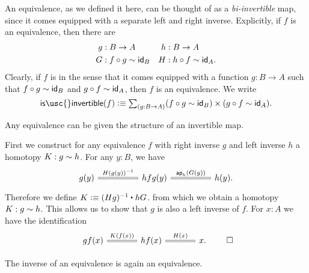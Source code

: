 \begin{rmk}
An equivalence, as we defined it here, can be thought of as a \emph{bi-invertible} map, since it comes equipped with a separate left and right inverse. Explicitly, if $f$ is an equivalence, then there are
\begin{align*}
g & : B\to A & h & : B\to A \\
G & : f\circ g \htpy \idfunc[B] & H & : h\circ f \htpy \idfunc[A].
\end{align*}
Clearly, if $f$ is  in the sense that it comes equipped with a function $g:B\to A$ such that $f\circ g\htpy\idfunc[B]$ and $g\circ f\htpy\idfunc[A]$, then $f$ is an equivalence. We write
\begin{equation*}
\mathsf{is\usc{}invertible}(f)\defeq\sm{g:B\to A} (f\circ g\htpy \idfunc[B])\times (g\circ f\htpy\idfunc[A]).
\end{equation*}
\end{rmk}

\begin{defn}\label{defn:inv_equiv}
Any equivalence can be given the structure of an invertible map.
\end{defn}

\begin{constr}
First we construct for any equivalence $f$ with right inverse $g$ and left inverse $h$ a homotopy $K:g\htpy h$. For any $y:B$, we have 
\begin{equation*}
\begin{tikzcd}[column sep=huge]
g(y) \arrow[r,equals,"H(g(y))^{-1}"] & hfg(y) \arrow[r,equals,"\ap{h}{G(y)}"] & h(y).
\end{tikzcd}
\end{equation*} 
Therefore we define $K\defeq \ct{(Hg)^{-1}}{hG}$.
from which we obtain a homotopy $K:g\htpy h$.
This allows us to show that $g$ is also a left inverse of $f$. For $x:A$ we have the identification
\begin{equation*}
\begin{tikzcd}[column sep=large]
gf(x) \arrow[r,equals,"K(f(x))"] & hf(x) \arrow[r,equals,"H(x)"] & x.
\end{tikzcd}\qedhere
\end{equation*}
\end{constr}

\begin{cor}
The inverse of an equivalence is again an equivalence.
\end{cor}

